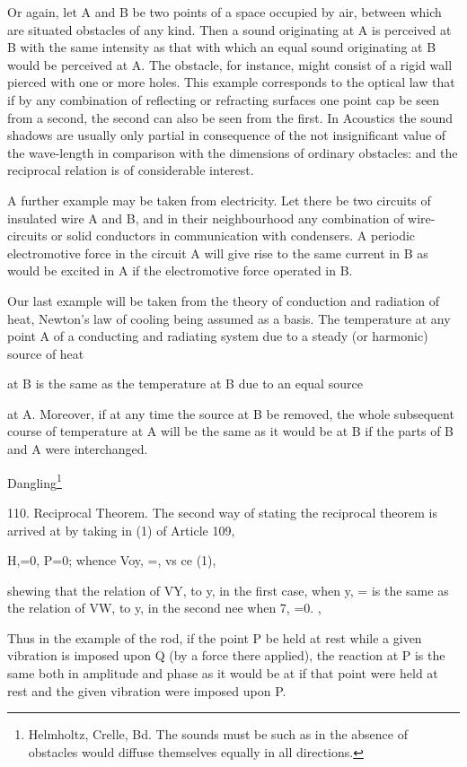 Or again, let A and B be two points of a space occupied by air, between which
are situated obstacles of any kind. Then a sound originating at A is perceived
at B with the same intensity as that with which an equal sound originating at B
would be perceived at A. The obstacle, for instance, might consist of a rigid
wall pierced with one or more holes.  This example corresponds to the optical
law that if by any combination of reflecting or refracting surfaces one point
cap be seen from a second, the second can also be seen from the first. In
Acoustics the sound shadows are usually only partial in consequence of the not
insignificant value of the wave-length in comparison with the dimensions of
ordinary obstacles: and the reciprocal relation is of considerable interest.

A further example may be taken from electricity. Let there be two circuits of
insulated wire A and B, and in their neighbourhood any combination of
wire-circuits or solid conductors in communication with condensers. A periodic
electromotive force in the circuit A will give rise to the same current in B as
would be excited in A if the electromotive force operated in B.

Our last example will be taken from the theory of conduction and radiation of
heat, Newton's law of cooling being assumed as a basis. The temperature at any
point A of a conducting and radiating system due to a steady (or harmonic)
source of heat

at B is the same as the temperature at B due to an equal source

at A. Moreover, if at any time the source at B be removed, the whole subsequent
course of temperature at A will be the same as it would be at B if the parts of
B and A were interchanged.

Dangling\footnote{ Helmholtz, Crelle, Bd. The sounds must be such as in the absence of
obstacles would diffuse themselves equally in all directions.}

110.  Reciprocal Theorem.  The second way of stating the reciprocal theorem is
arrived at by taking in (1) of Article 109,

H,=0, P=0; whence Voy, =, vs ce (1),

shewing that the relation of VY, to y, in the first case, when y, = is the same
as the relation of VW, to y, in the second nee when 7, =0. ,

Thus in the example of the rod, if the point P be held at rest while a given
vibration is imposed upon Q (by a force there applied), the reaction at P is
the same both in amplitude and phase as it would be at if that point were held
at rest and the given vibration were imposed upon P.

